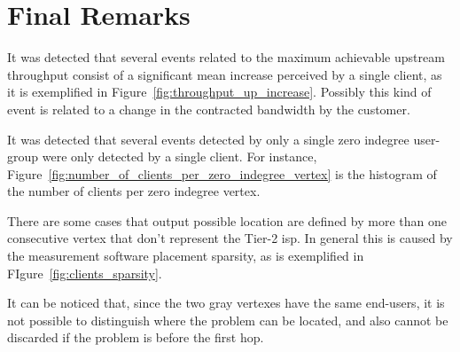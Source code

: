 \section{Final Remarks}

It was detected that several events related to the maximum achievable upstream
throughput consist of a significant mean increase perceived by a single client,
as it is exemplified in Figure~\ref{fig:throughput_up_increase}.
Possibly this kind of event is related to a change in the contracted bandwidth
by the customer.

It was detected that several events detected by only a single zero indegree
user-group were only detected by a single client. For instance,
Figure~\ref{fig:number_of_clients_per_zero_indegree_vertex} is the
histogram of the number of clients per zero indegree vertex.

There are some cases that output possible location are defined by more than one
consecutive vertex that don't represent the Tier-2 \gls*{isp}. In general this is
caused by the measurement software placement sparsity, as is exemplified in
FIgure~\ref{fig:clients_sparsity}.

It can be noticed that, since the two gray vertexes have the same end-users, it
is not possible to distinguish where the problem can be located, and also
cannot be discarded if the problem is before the first hop.
